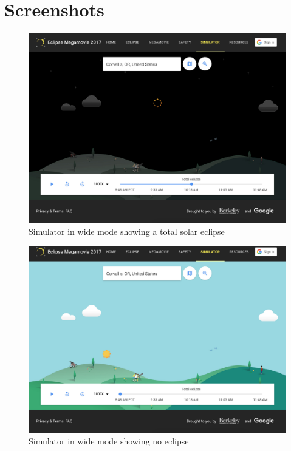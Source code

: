 \documentclass[10pt, onecolumn, draftclsnofoot, letterpaper, compsoc]{IEEEtran}
\begin{document}
\newpage
\section{Screenshots}

\begin{figure}[!h]
	\begin{center}
  		\includegraphics[width=\textwidth]{sim_total.eps}
		\caption{Simulator in wide mode showing a total solar eclipse}
	\end{center}
\end{figure}
\newpage

\begin{figure}[!h]
	\begin{center}
			\includegraphics[width=\textwidth]{sim.eps}
		\caption{Simulator in wide mode showing no eclipse}
	\end{center}
\end{figure}
\newpage
\end{document}
